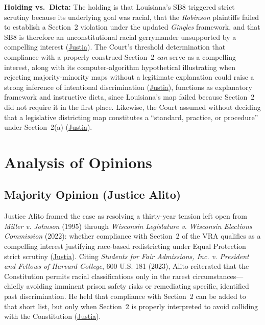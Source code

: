 \documentclass[12pt]{article}
\begin{document}
\textbf{Holding vs.\ Dicta:} The holding is that Louisiana's SB8 triggered strict scrutiny because its underlying goal was racial, that the \textit{Robinson} plaintiffs failed to establish a Section~2 violation under the updated \textit{Gingles} framework, and that SB8 is therefore an unconstitutional racial gerrymander unsupported by a compelling interest (\href{https://supreme.justia.com/cases/federal/us/608/24-109/}{Justia}). The Court's threshold determination that compliance with a properly construed Section~2 \textit{can} serve as a compelling interest, along with its computer-algorithm hypothetical illustrating when rejecting majority-minority maps without a legitimate explanation could raise a strong inference of intentional discrimination (\href{https://supreme.justia.com/cases/federal/us/608/24-109/}{Justia}), functions as explanatory framework and instructive dicta, since Louisiana's map failed because Section~2 did not require it in the first place. Likewise, the Court assumed without deciding that a legislative districting map constitutes a ``standard, practice, or procedure'' under Section~2(a) (\href{https://supreme.justia.com/cases/federal/us/608/24-109/}{Justia}).

\section{Analysis of Opinions}

\subsection{Majority Opinion (Justice Alito)}

Justice Alito framed the case as resolving a thirty-year tension left open from \textit{Miller v. Johnson} (1995) through \textit{Wisconsin Legislature v. Wisconsin Elections Commission} (2022): whether compliance with Section~2 of the VRA qualifies as a compelling interest justifying race-based redistricting under Equal Protection strict scrutiny (\href{https://supreme.justia.com/cases/federal/us/608/24-109/}{Justia}). Citing \textit{Students for Fair Admissions, Inc. v. President and Fellows of Harvard College}, 600 U.S. 181 (2023), Alito reiterated that the Constitution permits racial classifications only in the rarest circumstances---chiefly avoiding imminent prison safety risks or remediating specific, identified past discrimination. He held that compliance with Section~2 can be added to that short list, but only when Section~2 is properly interpreted to avoid colliding with the Constitution (\href{https://supreme.justia.com/cases/federal/us/608/24-109/}{Justia}).
\end{document}
